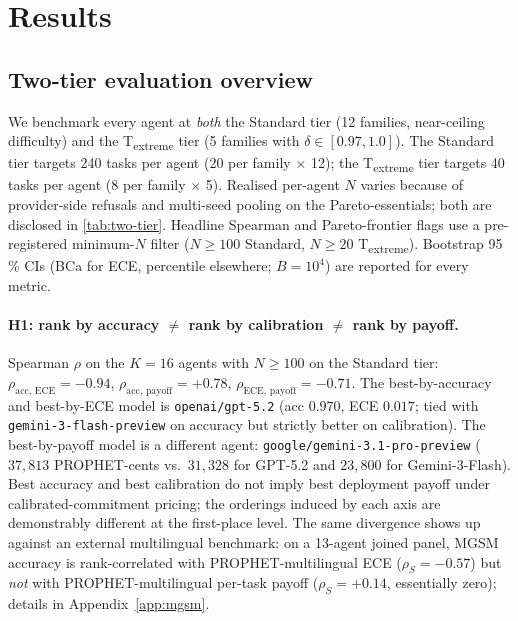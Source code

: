 \section{Results}\label{sec:results}

\subsection{Two-tier evaluation overview}
We benchmark every agent at \emph{both} the Standard tier (12 families,
near-ceiling difficulty) and the T\textsubscript{extreme} tier (5
families with $\delta \in [0.97, 1.0]$). The Standard tier targets 240
tasks per agent (20 per family $\times$ 12); the
T\textsubscript{extreme} tier targets 40 tasks per agent
(8 per family $\times$ 5). Realised per-agent $N$ varies because of
provider-side refusals and multi-seed pooling on the Pareto-essentials;
both are disclosed in \autoref{tab:two-tier}. Headline Spearman and
Pareto-frontier flags use a pre-registered minimum-$N$ filter
($N \ge 100$ Standard, $N \ge 20$ T\textsubscript{extreme}). Bootstrap
95\,\% CIs (BCa for ECE, percentile elsewhere; $B = 10^4$) are reported
for every metric.



\paragraph{H1: rank by accuracy $\ne$ rank by calibration $\ne$ rank by
payoff.}
Spearman $\rho$ on the $K = 16$ agents with $N \geq 100$ on the Standard
tier: $\rho_{\text{acc, ECE}} = -0.94$,
$\rho_{\text{acc, payoff}} = +0.78$,
$\rho_{\text{ECE, payoff}} = -0.71$. The best-by-accuracy and
best-by-ECE model is \texttt{openai/gpt-5.2} (acc $0.970$, ECE $0.017$;
tied with \texttt{gemini-3-flash-preview} on accuracy but strictly
better on calibration). The best-by-payoff model is a different agent:
\texttt{google/gemini-3.1-pro-preview} ($37{,}813$ PROPHET-cents vs.\
$31{,}328$ for GPT-5.2 and $23{,}800$ for Gemini-3-Flash). Best
accuracy and best calibration do not imply best deployment payoff under
calibrated-commitment pricing; the orderings induced by each axis are
demonstrably different at the first-place level. The same divergence
shows up against an external multilingual benchmark: on a 13-agent
joined panel, MGSM~\cite{mgsm} accuracy is rank-correlated with
PROPHET-multilingual ECE ($\rho_S = -0.57$) but \emph{not} with
PROPHET-multilingual per-task payoff ($\rho_S = +0.14$, essentially
zero); details in Appendix~\ref{app:mgsm}.

